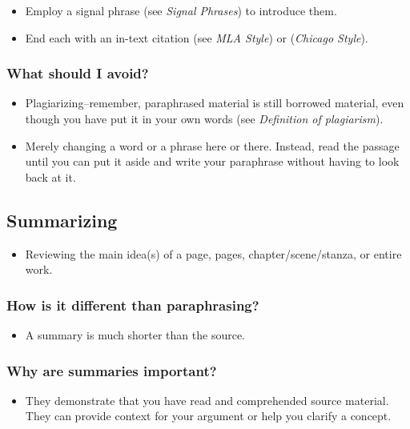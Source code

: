 \documentclass[12pt, hidelinks]{article} %
\begin{document}
\begin{itemize}
\item Employ a signal phrase (see \emph{Signal Phrases}) to introduce them.

\item End each with an in-text citation (see \emph{MLA Style}) or (\emph{Chicago Style}).
\end{itemize}

\subsubsection {What should I avoid?}

\begin{itemize}

\item Plagiarizing--remember, paraphrased material is still borrowed material, even though you have put it in your own words (see \emph{Definition of plagiarism}).

\item Merely changing a word or a phrase here or there. Instead, read the passage until you can put it aside and write your paraphrase without having to look back at it.
\end{itemize}


\subsection{Summarizing}

\begin{itemize}

\item Reviewing the main idea(s) of a page, pages, chapter/scene/stanza, or entire work.

\end{itemize}
\subsubsection {How is it different than paraphrasing?}

\begin{itemize}
\item A summary is much shorter than the source.
\end{itemize}
\subsubsection {Why are summaries important?}

\begin{itemize}
\item They demonstrate that you have read and comprehended source material. They can provide context for your argument or help you clarify a concept.
\end{itemize}
\end{document}
